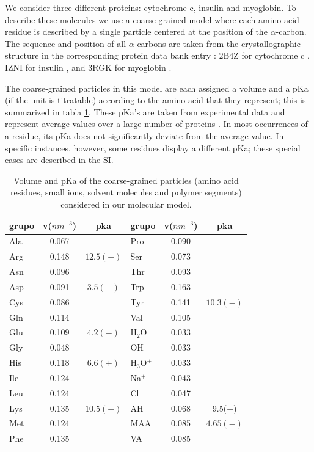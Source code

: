 We consider three different proteins:  cytochrome c, insulin and myoglobin.
To describe these molecules we use a coarse-grained model where each amino acid residue is described by a single particle centered at the position of the $\alpha$-carbon.
The sequence and position of all $\alpha$-carbons are taken from the crystallographic structure in the corresponding protein data bank entry : 2B4Z for cytochrome c , IZNI for insulin , and 3RGK for myoglobin \addcite[hubbard1990x]. 
 
 

The coarse-grained particles in this model are each assigned a volume and a pKa (if the unit is titratable) according to the amino acid that they represent; 
this is summarized in  tabla \ref{table:Coarse-grain}.
These pKa's are taken from experimental data and represent average values over a large number of proteins .
In most occurrences of a residue, its pKa does not significantly deviate from the average value.
In  specific instances, however, some residues display a different pKa;
these special cases are described in the SI.


\begin{table}
\centering
\small
\begin{tabular}{|lcc|lcc|}
\hline
grupo & v($nm^{-3}$) & pka & grupo & v($nm^{-3}$) & pka \\
\hline
Ala & 0.067 &  & Pro & 0.090 & \\
Arg & 0.148 & $12.5 (+)$& Ser & 0.073 &\\
Asn & 0.096 &  & Thr & 0.093 & \\
Asp & 0.091 & $3.5 (-)$ & Trp & 0.163 &\\
Cys & 0.086 &  & Tyr & 0.141 & $10.3 (-)$\\
Gln & 0.114 & & Val & 0.105 &\\  
Glu & 0.109 & $4.2 (-)$ & H$_2$O & 0.033 & \\ 
Gly & 0.048 &  & OH$^-$ & 0.033 & \\
His & 0.118 & $6.6 (+)$& H$_3$O$^+$ & 0.033 &  \\ 
Ile & 0.124 &  & Na$^+$ & 0.043 & \\ %
Leu & 0.124 &  & Cl$^-$ & 0.047 & \\
Lys & 0.135 & $10.5 (+)$ & AH & 0.068 &  9.5(+)\\
Met & 0.124 & & MAA & 0.085 & $4.65(-)$\\
Phe & 0.135 &   & VA & 0.085 & \\
\hline
\end{tabular}
\caption{Volume and pKa of the coarse-grained particles (amino acid residues, small ions, solvent molecules and polymer segments)  considered in our molecular model.}
\label{table:Coarse-grain} 
\end{table}


